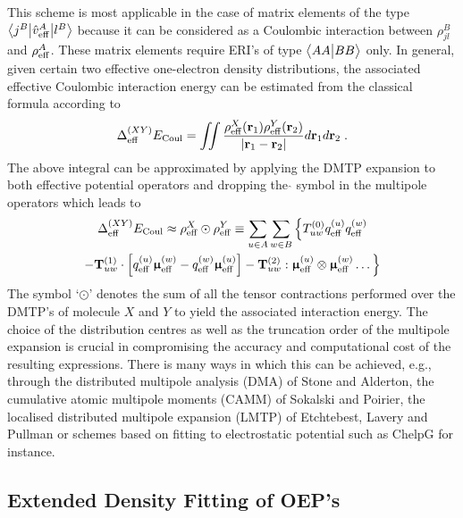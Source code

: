 \documentclass[aip,jcp,amsmath,amssymb,reprint,floatfix]{revtex4-1}
\begin{document}
This scheme is most applicable in the case of matrix elements of the type
$
 \bigl\langle {j^B} \bigl\lvert {\hat{v}_{\rm eff}^A} \bigl\lvert {l^B} \bigr\rangle
$
because it can be considered as a Coulombic interaction between $\rho^B_{jl}$
and $\rho^A_{\rm eff}$. These matrix elements require ERI's of type
$\bigl\langle {AA} \bigl\lvert {BB} \bigr\rangle$ only.
In general, given certain two effective one\hyp{}electron density distributions,
the associated effective Coulombic interaction energy can be estimated from the classical formula
according to
%
\begin{equation} \label{e:coulomb-energy:general}
 \Delta^{(XY)}_{\rm eff} E_{\rm Coul} = \iint \frac{\rho_{\rm eff}^X({\bf r}_1) \rho_{\rm eff}^Y({\bf r}_2)}
 {\vert {\bf r}_1 - {\bf r}_2 \vert} 
d{\bf r}_1 d{\bf r}_2 \;.
\end{equation}
%
The above integral can be approximated by 
applying the DMTP expansion 
to both effective potential operators
and dropping the $\hat{}$ symbol in the multipole operators
which leads to\cite{Stone.TheTheoryOfIntermolecularForces.1996}
%
\begin{multline} \label{e:coulomb-energy:dmtp}
  \Delta^{(XY)}_{\rm eff} E_{\rm Coul} \approx
 \rho_{\rm eff}^X \odot \rho_{\rm eff}^Y \equiv
 \sum_{u\in A} \sum_{w\in B} \Big\{ 
 T^{(0)}_{uw}
 q_{\rm eff}^{(u)}  q_{\rm eff}^{(w)} \\
 - {\bf T}^{(1)}_{uw} \cdot 
   \left[ q_{\rm eff}^{(u)} {\bm{\upmu}}_{\rm eff}^{(w)} - q_{\rm eff}^{(w)} {\bm{\upmu}}_{\rm eff}^{(u)} \right]
 - {\bf T}^{(2)}_{uw} : 
  {\bm{\upmu}}_{\rm eff}^{(u)}  \otimes {\bm{\upmu}}_{\rm eff}^{(w)} 
 \ldots
 \Big\}
\end{multline}
%
The symbol `$\odot$' denotes the sum of all the tensor contractions
performed over the DMTP's of molecule $X$ and $Y$ to yield the associated interaction energy.
The choice of the distribution centres as well as the truncation order of the multipole expansion
is crucial in compromising the accuracy and computational cost of the resulting expressions.
There is many ways in which this can be achieved, e.g., through the distributed multipole analysis (DMA)
of Stone and Alderton\cite{Stone.Alderton.MolPhys.1985,Stone.JCTC.2005},
the cumulative atomic multipole moments (CAMM) of Sokalski and Poirier\cite{Sokalski.Poirier.CPL.1983},
the localised distributed multipole expansion (LMTP) of Etchtebest, Lavery and Pullman\cite{Etchebest.Lavery.Pullman.TheorChimActa.1982}
or schemes based on fitting to electrostatic potential such as ChelpG\cite{Breneman.Wiberg.JCC.1990} for instance.

\subsection{\label{ss:2.3.oep-GDF}Extended Density Fitting of OEP's}
\end{document}
